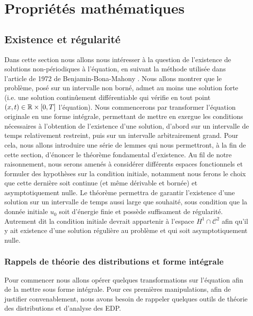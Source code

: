 \chapter{Propriétés mathématiques}

\section{Existence et régularité}

Dans cette section nous allons nous intéresser à la question de l'existence de solutions non-périodiques à l'équation, en suivant la méthode utilisée dans l'article de 1972 de Benjamin-Bona-Mahony \cite{BBM}.
Nous allons montrer que le problème, posé sur un intervalle non borné, admet au moins une solution forte (i.e. une solution continûement
différentiable qui vérifie en tout point $(x,t) \in \mathbb{R} \times [0,T] $ l'équation). 
Nous commencerons par transformer l'équation originale en une forme intégrale, permettant de mettre en exergue les conditions 
nécessaires à l'obtention de l'existence d'une solution, d'abord sur un intervalle de temps relativement restreint, puis sur un intervalle arbitrairement grand.
Pour cela, nous allons introduire une série de lemmes qui nous permettront, à la fin de cette section, d'énoncer le théorème fondamental d'existence. Au fil de notre raisonnement,
nous serons amenés à considérer différents espaces fonctionnels et formuler des hypothèses sur la condition initiale, notamment nous ferons le choix que cette dernière
soit continue (et même dérivable et bornée) et asymptotiquement nulle.
Le théorème permettra de garantir l'existence d'une solution sur un intervalle de temps aussi large que souhaité, sous condition
que la donnée initiale $u_0$ soit d'énergie finie et possède suffisament de régularité. Autrement dit la condition initiale devrait appartenir à l'espace $H^1 \cap \mathcal{C}^2 $ afin qu'il y ait 
existence d'une solution régulière au problème et qui soit asymptotiquement nulle.

\vspace{1em}

\subsection{Rappels de théorie des distributions et forme intégrale}

Pour commencer nous allons opérer quelques transformations sur l'équation afin de la mettre sous forme intégrale. 
Pour ces premières manipulations, afin de justifier convenablement, nous avons besoin de rappeler quelques outils de théorie des distributions et d'analyse des EDP.

